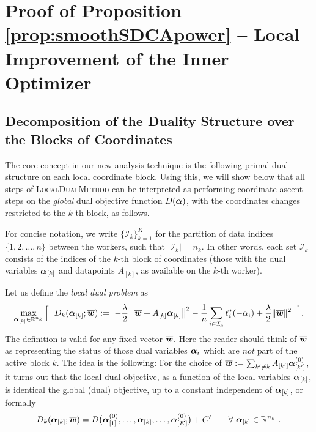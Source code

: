 \documentclass{article} %
\newcommand{\localalgname}{\textsc{LocalDualMethod}\xspace}
\begin{document}
%
\section{Proof of Proposition \ref{prop:smoothSDCApower} -- Local Improvement of the Inner Optimizer}


\subsection{Decomposition of the Duality Structure over the Blocks of Coordinates}
The core concept in our new analysis technique is the following primal-dual structure on each local coordinate block.
Using this, we will show below that all steps of \localalgname can be interpreted as performing coordinate ascent steps on the \emph{global} dual objective function $D(\bm{\alpha})$, with the coordinates changes restricted to the $k$-th block, as follows.

For concise notation, we write $\{\mathcal{I}_k\}_{k=1}^K$ for the partition of data indices $\{1,2,\dots,n\}$ between the workers, such that $|\mathcal{I}_k|=n_k$. In other words, each set $\mathcal{I}_k$ consists of the indices of the $k$-th block of coordinates (those with the dual variables $\bm{\alpha}_{[k]}$ and datapoints $A_{[k]}$, as available on the $k$-th worker).

Let us define the \emph{local dual problem} as
\begin{equation}\label{eq:localDual}
\max_{\bm{\alpha}_{[k]} \in\mathbb{R}^{n_k}}    \Big[
    \ \  D_k(\bm{\alpha}_{[k]};\overline{{\bm{w}}}) 
    :=\ - \frac{\lambda}{2} \left\lVert \overline{{\bm{w}}} + A_{[k]} \bm{\alpha}_{[k]} \right\rVert^2
      - \frac1n \sum_{i\in\mathcal{I}_k} \ell_i^*(-\alpha_i) 
      + \frac \lambda 2 \| \overline{{\bm{w}}}\|^2
     \ \ \Big] .
\end{equation}
The definition is valid for any fixed vector $\overline{{\bm{w}}}$. Here the reader should think of  $\overline{{\bm{w}}}$ as representing the status of those dual variables $\bm{\alpha}_i$ which are \emph{not} part of the active block $k$. The idea is the following:
For the choice of $\overline{{\bm{w}}} := \sum_{k'\ne k} A_{[k']}\bm{\alpha}^{(0)}_{[k']}$, it turns out that the local dual objective, as a function of the local variables $\bm{\alpha}_{[k]}$, is identical the global (dual) objective, up to a constant independent of $\bm{\alpha}_{[k]}$, or formally
\[
D_k(\bm{\alpha}_{[k]};\overline{{\bm{w}}}) = D\big(\bm{\alpha}^{(0)}_{[1]},\dots,\bm{\alpha}_{[k]},\dots,\bm{\alpha}^{(0)}_{[K]}\big) + C'
    ~~~~~~ \forall\ \bm{\alpha}_{[k]} \in\mathbb{R}^{n_k} \ .
\]
\end{document}
